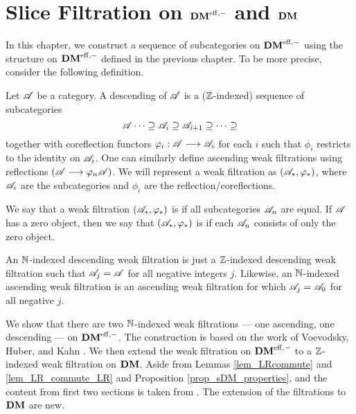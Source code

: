 \newpage
\chapter{Slice Filtration on $\mathbf{DM}^{\mathrm{eff},-}$ and $\mathbf{DM}$}\label{sect_slice_filt_dm}

In this chapter, we construct a sequence of subcategories on 
$\mathbf{DM}^{\mathrm{eff},-}$ using the structure on $\mathbf{DM}^{\mathrm{eff},-}$ defined in the previous
chapter. To be more precise, consider the following definition.

\begin{defn}\label{def_cat_filtration}
Let $\mathscr{A}$ be a category. A descending  of 
$\mathscr{A}$ is a ($\mathbb{Z}$-indexed) sequence of subcategories
\[
\mathscr{A} \cdots \supseteq \mathscr{A}_i \supseteq \mathscr{A}_{i + 1}
   \supseteq \cdots \supseteq 
\]
together with coreflection functors $\varphi_i: \mathscr{A} \longrightarrow \mathscr{A}_i$
for each $i$ such that $\phi_i$ restricts to the identity on
$\mathscr{A}_i$. One can similarly define ascending weak filtrations using
reflections $(\mathscr{A} \longrightarrow \varphi_n\mathscr{A})$.  We will represent a weak
filtration as $(\mathscr{A}_*, \varphi_*)$, where $\mathscr{A}_i$ are the
subcategories and $\phi_i$ are the reflection/coreflections.

We say that a weak filtration $(\mathscr{A}_*, \varphi_*)$ is 
 if all subcategories $\mathscr{A}_n$ are equal. If
$\mathscr{A}$ has a zero object, then we say that $(\mathscr{A}_*, \varphi_*)$
is  if each $\mathscr{A}_n$ consists of only the zero object.
\end{defn}

\begin{rmk}
An $\mathbb{N}$-indexed descending weak filtration is just a $\mathbb{Z}$-indexed 
descending weak filtration such that $\mathscr{A}_j = \mathscr{A}$
for all negative integers $j$. Likewise, an $\mathbb{N}$-indexed ascending 
weak filtration is an ascending weak filtration for which
$\mathscr{A}_j = \mathscr{A}_0$ for all negative $j$.
\end{rmk}

We show that there are two $\mathbb{N}$-indexed weak filtrations --- 
one ascending, one descending --- on $\mathbf{DM}^{\mathrm{eff},-}$. The construction 
is based on the work of Voevodsky, Huber, and Kahn \cite{HuKa}. 
We then extend the weak filtration on $\mathbf{DM}^{\mathrm{eff},-}$ to a $\mathbb{Z}$-indexed
weak filtration on $\mathbf{DM}$. Aside from Lemmas \ref{lem_LRcommute} 
and \ref{lem_LR_commute_LR} and Proposition 
\ref{prop_sDM_properties}, and the content from first two sections 
is taken from \cite[\S 1]{HuKa}. The extension of the filtrations 
to $\mathbf{DM}$ are new.

